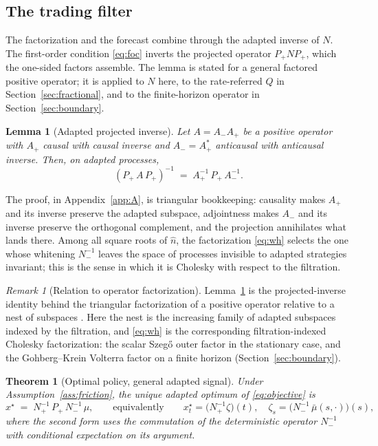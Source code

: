 \documentclass[11pt]{article}
\theoremstyle{plain}
\newtheorem{theorem}{Theorem}
\newtheorem{lemma}{Lemma}
\theoremstyle{definition}
\theoremstyle{remark}
\newtheorem{remark}{Remark}
\begin{document}
\subsection{The trading filter}\label{sec:filter}

The factorization and the forecast combine through the adapted inverse of $N$. The first-order condition \eqref{eq:foc} inverts the projected operator $P_+NP_+$, which the one-sided factors assemble. The lemma is stated for a general factored positive operator; it is applied to $N$ here, to the rate-referred $Q$ in Section~\ref{sec:fractional}, and to the finite-horizon operator in Section~\ref{sec:boundary}.

\begin{lemma}[Adapted projected inverse]\label{lem:pi}
Let $A=A_-A_+$ be a positive operator with $A_+$ causal with causal inverse and $A_-=A_+^*$ anticausal with anticausal inverse. Then, on adapted processes,
\begin{equation}\label{eq:pi}
(P_+\,A\,P_+)^{-1} \;=\; A_+^{-1}\,P_+\,A_-^{-1}.
\end{equation}
\end{lemma}

The proof, in Appendix~\ref{app:A}, is triangular bookkeeping: causality makes $A_+$ and its inverse preserve the adapted subspace, adjointness makes $A_-$ and its inverse preserve the orthogonal complement, and the projection annihilates what lands there. Among all square roots of $\hat n$, the factorization \eqref{eq:wh} selects the one whose whitening $N_-^{-1}$ leaves the space of processes invisible to adapted strategies invariant; this is the sense in which it is Cholesky with respect to the filtration.

\begin{remark}[Relation to operator factorization]\label{rmk:nest}
Lemma~\ref{lem:pi} is the projected-inverse identity behind the triangular factorization of a positive operator relative to a nest of subspaces \citep{GohbergKrein1970,Arveson1975}. Here the nest is the increasing family of adapted subspaces indexed by the filtration, and \eqref{eq:wh} is the corresponding filtration-indexed Cholesky factorization: the scalar Szeg\H{o} outer factor in the stationary case, and the Gohberg--Krein Volterra factor on a finite horizon (Section~\ref{sec:boundary}).
\end{remark}

\begin{theorem}[Optimal policy, general adapted signal]\label{thm:general}
Under Assumption~\ref{ass:friction}, the unique adapted optimum of \eqref{eq:objective} is
\begin{equation}\label{eq:policy}
x^\star \;=\; N_+^{-1}\,P_+\,N_-^{-1}\,\mu,
\qquad\text{equivalently}\qquad
x^\star_t = \bigl(N_+^{-1}\zeta\bigr)(t), \quad
\zeta_s = \bigl(N_-^{-1}\,\bar\mu(s,\cdot)\bigr)(s),
\end{equation}
where the second form uses the commutation of the deterministic operator $N_-^{-1}$ with conditional expectation on its argument.
\end{theorem}
\end{document}
